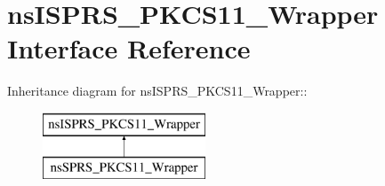 \hypertarget{classnsISPRS__PKCS11__Wrapper}{
\section{nsISPRS\_\-PKCS11\_\-Wrapper Interface Reference}
\label{classnsISPRS__PKCS11__Wrapper}
}
Inheritance diagram for nsISPRS\_\-PKCS11\_\-Wrapper::\begin{figure}[H]
\begin{center}
\leavevmode
\includegraphics[height=2cm]{classnsISPRS__PKCS11__Wrapper}
\end{center}
\end{figure}
